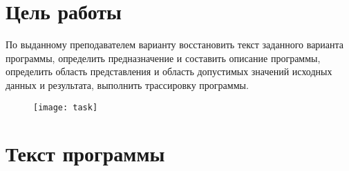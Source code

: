 \tableofcontents
\newpage

\section{Цель работы}
По выданному преподавателем варианту восстановить текст заданного варианта программы, определить предназначение и составить описание программы, определить область представления и область допустимых значений исходных данных и результата, выполнить трассировку программы.
\begin{figure}[H]
\centering
\texttt{[image: task]}
\label{pic:task}
\end{figure}
              
\section{Текст программы}
\noindent
